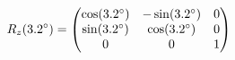 \documentclass[preview]{standalone}
\begin{document}
\begin{align*}
\special{dvisvgm:raw <g id='unique000'>}R_z(3.2^\circ) = \begin{pmatrix} \cos(3.2^\circ) & -\sin(3.2^\circ) & 0 \\ \sin(3.2^\circ) & \cos(3.2^\circ) & 0 \\ 0 & 0 & 1 \end{pmatrix}\special{dvisvgm:raw </g>}
\end{align*}
\end{document}
